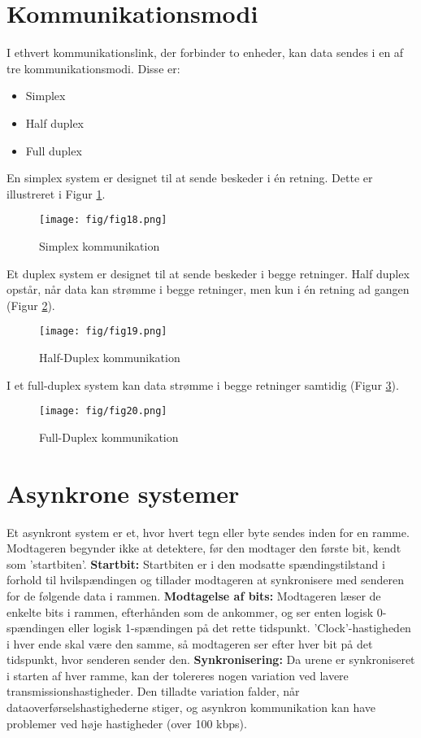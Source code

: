 \section{Kommunikationsmodi}
I ethvert kommunikationslink, der forbinder to enheder, kan data sendes i en af tre kommunikationsmodi. Disse er:
\begin{itemize}
	\item Simplex
	\item Half duplex
	\item Full duplex
\end{itemize}
En simplex system er designet til at sende beskeder i én retning. Dette er illustreret i Figur \ref{fig:simplex}.
\begin{figure}[h]
	\centering
	\texttt{[image: fig/fig18.png]}
	\caption{Simplex kommunikation}
	\label{fig:simplex}
\end{figure}

\noindent Et duplex system er designet til at sende beskeder i begge retninger. Half duplex opstår, når data kan strømme i begge retninger, men kun i én retning ad gangen (Figur \ref{fig:half-duplex}).
\begin{figure}[h]
	\centering
	\texttt{[image: fig/fig19.png]}
	\caption{Half-Duplex kommunikation}
	\label{fig:half-duplex}
\end{figure}

\noindent I et full-duplex system kan data strømme i begge retninger samtidig (Figur \ref{fig:full-duplex}).
\begin{figure}[h]
	\centering
	\texttt{[image: fig/fig20.png]}
	\caption{Full-Duplex kommunikation}
	\label{fig:full-duplex}
\end{figure}

\section{Asynkrone systemer}
Et asynkront system er et, hvor hvert tegn eller byte sendes inden for en ramme. Modtageren begynder ikke at detektere, før den modtager den første bit, kendt som 'startbiten'.
\newline\newline\noindent
\textbf{Startbit:} Startbiten er i den modsatte spændingstilstand i forhold til hvilspændingen og tillader modtageren at synkronisere med senderen for de følgende data i rammen.
\newline\newline\noindent
\textbf{Modtagelse af bits:} Modtageren læser de enkelte bits i rammen, efterhånden som de ankommer, og ser enten logisk 0-spændingen eller logisk 1-spændingen på det rette tidspunkt. 'Clock'-hastigheden i hver ende skal være den samme, så modtageren ser efter hver bit på det tidspunkt, hvor senderen sender den.
\newline\newline\noindent
\textbf{Synkronisering:} Da urene er synkroniseret i starten af hver ramme, kan der tolereres nogen variation ved lavere transmissionshastigheder. Den tilladte variation falder, når dataoverførselshastighederne stiger, og asynkron kommunikation kan have problemer ved høje hastigheder (over 100 kbps).

